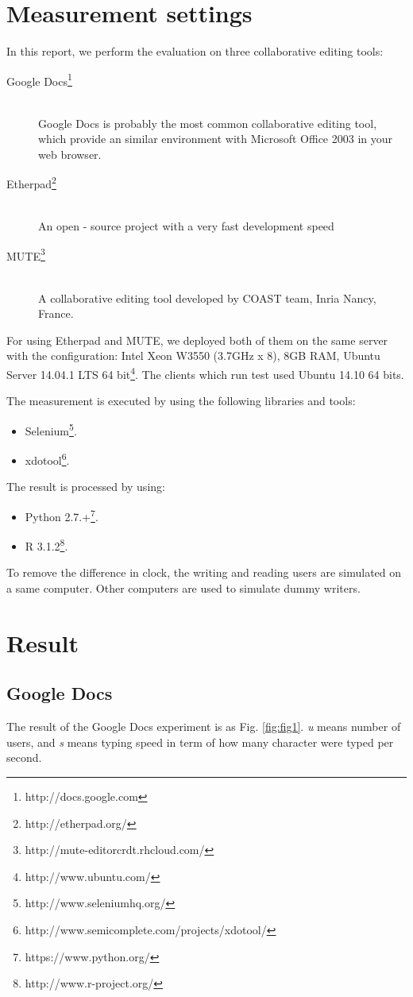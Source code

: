 \documentclass[a4paper,12pt]{report}
\begin{document}
\section{Measurement settings}
In this report, we perform the evaluation on three collaborative editing tools:
	\begin{description}
		\item [Google Docs\footnote{http://docs.google.com}] \hfill \\
			Google Docs is probably the most common collaborative editing tool, which provide an similar environment with Microsoft Office 2003 in your web browser.
		\item [Etherpad\footnote{http://etherpad.org/}] \hfill \\
			An open - source project with a very fast development speed
		\item [MUTE\footnote{http://mute-editorcrdt.rhcloud.com/}] \hfill \\
			A collaborative editing tool developed by COAST team, Inria Nancy, France.
	\end{description}
For using Etherpad and MUTE, we deployed both of them on the same server with the configuration: Intel Xeon W3550 (3.7GHz x 8), 8GB RAM, Ubuntu Server 14.04.1 LTS 64 bit\footnote{http://www.ubuntu.com/}.
The clients which run test used Ubuntu 14.10 64 bits.

The measurement is executed by using the following libraries and tools:
	\begin{itemize}
		\item Selenium\footnote{http://www.seleniumhq.org/}.
		\item xdotool\footnote{http://www.semicomplete.com/projects/xdotool/}.
	\end{itemize}
The result is processed by using:
	\begin{itemize}
		\item Python 2.7.+\footnote{https://www.python.org/}.
		\item R 3.1.2\footnote{http://www.r-project.org/}.
	\end{itemize}	 
To remove the difference in clock, the writing and reading users are simulated on a same computer. Other computers are used to simulate dummy writers.
\section{Result}
\subsection{Google Docs}
The result of the Google Docs experiment is as Fig. \ref{fig:fig1}. \textit{u} means number of users, and \textit{s} means typing speed in term of how many character were typed per second.
\end{document}
